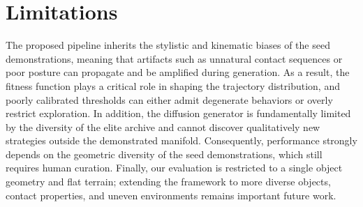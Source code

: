 \documentclass{article}
\newcommand{\papertitle}{Humanoid-DART}
\begin{document}
\section{Limitations}
The proposed pipeline inherits the stylistic and kinematic biases of the seed demonstrations, meaning that artifacts such as unnatural contact sequences or poor posture can propagate and be amplified during generation. As a result, the fitness function plays a critical role in shaping the trajectory distribution, and poorly calibrated thresholds can either admit degenerate behaviors or overly restrict exploration. In addition, the diffusion generator is fundamentally limited by the diversity of the elite archive and cannot discover qualitatively new strategies outside the demonstrated manifold. Consequently, performance strongly depends on the geometric diversity of the seed demonstrations, which still requires human curation. Finally, our evaluation is restricted to a single object geometry and flat terrain; extending the framework to more diverse objects, contact properties, and uneven environments remains important future work.


\end{document}
